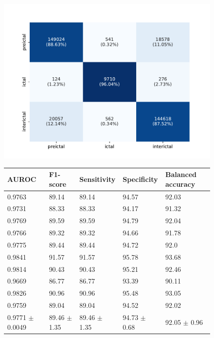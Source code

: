 \documentclass[a4paper,fleqn]{cas-sc}
\begin{document}
\begin{figure}[hbt]
  \hspace*{\fill}%
  \begin{minipage}[t]{0.45\textwidth}
    \centering
    \vspace{0pt}
    \includegraphics[scale=0.45]{figures/conf_lookback_1200.pdf}
    \label{fig:conf-matrix-1200}
  \end{minipage}%
  \begin{minipage}[t]{0.55\textwidth}
  \centering
  \vspace{0pt}
    \begin{tabular}{|p{0.5in}|p{0.5in}|p{0.5in}|p{0.5in}|p{0.5in}|}
    \hline
    AUROC & F1-score & Sensitivity & Specificity & Balanced \newline accuracy \\
    \hline
    0.9763 & 89.14 & 89.14 & 94.57 & 92.03 \\
    0.9731 & 88.33 & 88.33 & 94.17 & 91.32 \\
    0.9769 & 89.59 & 89.59 & 94.79 & 92.04 \\
    0.9766 & 89.32 & 89.32 & 94.66 & 91.78 \\
    0.9775 & 89.44 & 89.44 & 94.72 & 92.0 \\
    0.9841 & 91.57 & 91.57 & 95.78 & 93.68 \\
    0.9814 & 90.43 & 90.43 & 95.21 & 92.46 \\
    0.9669 & 86.77 & 86.77 & 93.39 & 90.11 \\
    0.9826 & 90.96 & 90.96 & 95.48 & 93.05 \\
    0.9759 & 89.04 & 89.04 & 94.52 & 92.02 \\
    \hline
    0.9771 \newline $\pm$ 0.0049 & 89.46 \newline $\pm$ 1.35 & 89.46 \newline $\pm$ 1.35 & 94.73 \newline $\pm$ 0.68 & 92.05 \newline $\pm$ 0.96 \\
    \hline
\end{tabular}


\end{minipage}
\end{figure}
\end{document}
